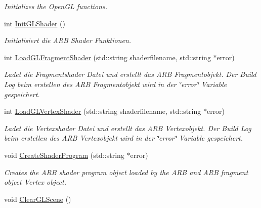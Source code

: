 \begin{DoxyCompactItemize}
\begin{DoxyCompactList}\small\item\em Initializes the OpenGL functions. \item\end{DoxyCompactList}\item 
int \hyperlink{class_f2_c_1_1_window_a085055cbf85676cd03f38b1105afb669}{InitGLShader} ()
\begin{DoxyCompactList}\small\item\em Initialisiert die ARB Shader Funktionen. \item\end{DoxyCompactList}\item 
int \hyperlink{class_f2_c_1_1_window_a017173888582ad09c18f85ceedaee593}{LoadGLFragmentShader} (std::string shaderfilename, std::string $\ast$error)
\begin{DoxyCompactList}\small\item\em Ladet die Fragmentshader Datei und erstellt das ARB Fragmentobjekt. Der Build Log beim erstellen des ARB Fragmentobjekt wird in der \char`\"{}error\char`\"{} Variable gespeichert. \item\end{DoxyCompactList}\item 
int \hyperlink{class_f2_c_1_1_window_aa2b637446b9c4e8e9e93001e32945ae4}{LoadGLVertexShader} (std::string shaderfilename, std::string $\ast$error)
\begin{DoxyCompactList}\small\item\em Ladet die Vertexshader Datei und erstellt das ARB Vertexobjekt. Der Build Log beim erstellen des ARB Vertexobjekt wird in der \char`\"{}error\char`\"{} Variable gespeichert. \item\end{DoxyCompactList}\item 
void \hyperlink{class_f2_c_1_1_window_adad7a68be0de8516ae26ca4af18a2bdf}{CreateShaderProgram} (std::string $\ast$error)
\begin{DoxyCompactList}\small\item\em Creates the ARB shader program object loaded by the ARB and ARB fragment object Vertex object. \item\end{DoxyCompactList}\item 
\hypertarget{class_f2_c_1_1_window_a0aefe1654782a8f3105ef6a46867e280}{
void \hyperlink{class_f2_c_1_1_window_a0aefe1654782a8f3105ef6a46867e280}{ClearGLScene} ()}
\label{class_f2_c_1_1_window_a0aefe1654782a8f3105ef6a46867e280}


\end{DoxyCompactItemize}
